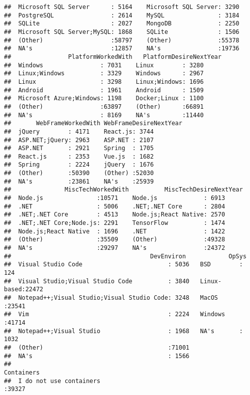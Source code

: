\documentclass[]{article}
\begin{document}
\begin{verbatim}
##  Microsoft SQL Server      : 5164    Microsoft SQL Server: 3290     
##  PostgreSQL                : 2614    MySQL               : 3184     
##  SQLite                    : 2027    MongoDB             : 2250     
##  Microsoft SQL Server;MySQL: 1868    SQLite              : 1506     
##  (Other)                   :58797    (Other)             :55378     
##  NA's                      :12857    NA's                :19736     
##                PlatformWorkedWith   PlatformDesireNextYear
##  Windows                : 7031    Linux        : 3280     
##  Linux;Windows          : 3329    Windows      : 2967     
##  Linux                  : 3298    Linux;Windows: 1696     
##  Android                : 1961    Android      : 1509     
##  Microsoft Azure;Windows: 1198    Docker;Linux : 1100     
##  (Other)                :63897    (Other)      :66891     
##  NA's                   : 8169    NA's         :11440     
##       WebFrameWorkedWith WebFrameDesireNextYear
##  jQuery        : 4171    React.js: 3744        
##  ASP.NET;jQuery: 2963    ASP.NET : 2107        
##  ASP.NET       : 2921    Spring  : 1705        
##  React.js      : 2353    Vue.js  : 1682        
##  Spring        : 2224    jQuery  : 1676        
##  (Other)       :50390    (Other) :52030        
##  NA's          :23861    NA's    :25939        
##               MiscTechWorkedWith          MiscTechDesireNextYear
##  Node.js               :10571    Node.js             : 6913     
##  .NET                  : 5006    .NET;.NET Core      : 2804     
##  .NET;.NET Core        : 4513    Node.js;React Native: 2570     
##  .NET;.NET Core;Node.js: 2291    TensorFlow          : 1474     
##  Node.js;React Native  : 1696    .NET                : 1422     
##  (Other)               :35509    (Other)             :49328     
##  NA's                  :29297    NA's                :24372     
##                                       DevEnviron            OpSys      
##  Visual Studio Code                        : 5036   BSD        :  124  
##  Visual Studio;Visual Studio Code          : 3840   Linux-based:22472  
##  Notepad++;Visual Studio;Visual Studio Code: 3248   MacOS      :23541  
##  Vim                                       : 2224   Windows    :41714  
##  Notepad++;Visual Studio                   : 1968   NA's       : 1032  
##  (Other)                                   :71001                      
##  NA's                                      : 1566                      
##                                                                  Containers   
##  I do not use containers                                              :39327  

\end{verbatim}
\end{document}
